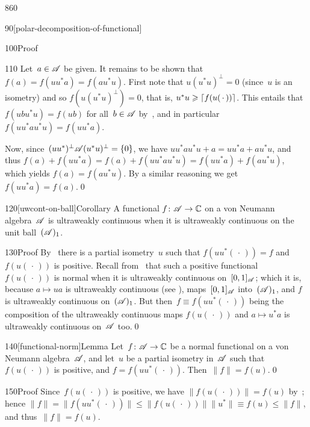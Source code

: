 \begin{parsec}{860}
\begin{point}{90}[polar-decomposition-of-functional]
\begin{point}{100}{Proof}
\begin{point}{110}
Let~$a\in\mathscr{A}$ be given.
It remains to be shown that $f(a)=f(uu^*a)=f(au^*u)$.
First note that  $u(u^*u)^\perp = 0$ (since~$u$ is an isometry)
and so $f(u(u^*u)^\perp)=0$,
that is,  $u^*u\geqslant \left\lceil f(u(\,\cdot\,))\right\rceil$.
This entails that $f(ubu^*u)=f(ub)$ for all~$b\in\mathscr{A}$
by~, and in particular $f(uu^*au^*u)=f(uu^*a)$.

Now, since~$(uu^*)^\perp\mathscr{A}(u^*u)^\perp = \{0\}$,
we have $uu^* a u^*u + a = uu^*a + au^*u$,
and thus $f(a)+f(uu^*a)=f(a)+f(uu^*au^*u)=f(uu^*a)+f(au^*u)$,
which yields $f(a)=f(au^*u)$.
By a similar reasoning we get $f(uu^*a)=f(a)$.\qed
\end{point}
\end{point}
\end{point}
\begin{point}{120}[uwcont-on-ball]{Corollary}%
A functional $f\colon \mathscr{A}\to\mathbb{C}$
on a von Neumann algebra~$\mathscr{A}$
is ultraweakly continuous
when it is ultraweakly continuous
on the unit ball~$(\mathscr{A})_1$.
\begin{point}{130}{Proof}%
By~
there is a partial isometry~$u$
such that $f(uu^*(\,\cdot\,))=f$
and~$f(u(\,\cdot\,))$ is positive.
Recall from~ that such a positive functional~$f(u(\,\cdot\,))$
is normal when it is ultraweakly continuous
on~$[0,1]_{\mathscr{A}}$;
which it is, 
because $a\mapsto ua$ is ultraweakly continuous (see ),
maps~$[0,1]_{\mathscr{A}}$ into~$(\mathscr{A})_1$,
and $f$ is ultraweakly continuous on~$(\mathscr{A})_1$.
But then~$f\equiv f(uu^*(\,\cdot\,))$
being the composition of the ultraweakly continuous maps
$f(u(\,\cdot\,))$ and $a\mapsto u^*a$ 
is ultraweakly continuous on~$\mathscr{A}$ too.\qed
\end{point}
\end{point}
\begin{point}{140}[functional-norm]{Lemma}%
Let~$f\colon \mathscr{A}\to\mathbb{C}$
be a normal functional
on a von Neumann algebra~$\mathscr{A}$,
and let~$u$ be a partial isometry in~$\mathscr{A}$
such that~$f(u(\,\cdot\,))$ is positive,
and $f=f(uu^*(\,\cdot\,))$.
Then~$\|f\|=f(u)$.\qed
\begin{point}{150}{Proof}%
Since~$f(u(\,\cdot\,))$ is positive,
we have $\|f(u(\,\cdot\,))\|=f(u)$
by~;
hence $\|f\|=\|f(uu^*(\,\cdot\,))\|
\leq \|f(u(\,\cdot\,))\|\|u^*\|
\equiv f(u) \leq \|f\|$,
and thus~$\|f\|=f(u)$.
\end{point}
\end{point}
\end{parsec}
